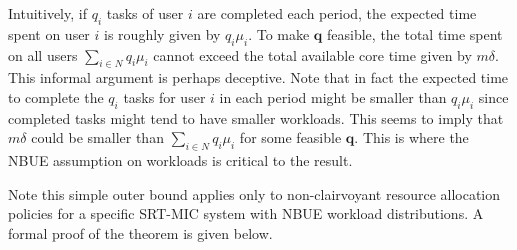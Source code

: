 \documentclass[prodmode,acmtompecs]{acmsmall}
\newcommand{\reqvec}{\mathbf{q}}
\newcommand{\reqscalar}{q}
\newcommand{\fullUserSet}{N}
\newcommand{\myComments}[1]{}
\newif\ifinfocom
\newif\iftompecs
\newcommand{\infocomStart}{\ifinfocom \myComments{Infocom: }}
\newcommand{\tompecsStart}{\iftompecs \myComments{TOMPECS version: }}
\newcommand{\commentEnd}{\myComments{End}}
\begin{document}
Intuitively, if $q_i$ tasks of user $i$ are completed each period, the expected time spent on user $i$ is roughly given by $q_i\mu_i$. To make $\reqvec$ feasible, the total time spent on all users $\sum\limits_{i\in \fullUserSet} q_i \mu_i$ cannot exceed the total available core time given by $m\delta$. 
This informal argument is perhaps deceptive. 
Note that in fact the expected time to complete the $q_i$ tasks for user $i$ in each period might be smaller than $q_i\mu_i$ since completed tasks might tend to have smaller workloads. This seems to imply that $m\delta$ could be smaller than $\sum\limits_{i\in \fullUserSet}\reqscalar_i \mu_i$ for some feasible $\reqvec$. This is where the NBUE assumption on workloads is critical to the result. 
\infocomStart
See Appendix \ref{appendix_pf_R_OB} for a detailed proof. 

This simple outer bound applies to any non-clairvoyant resource allocation policy in any specific SRT-MIC system with NBUE workload distributions. 
Note however the result does not necessarily hold for non-NBUE workloads. See the extended version of this paper \cite{EXT} for an illustrative example. 
\commentEnd\fi

\tompecsStart
Note this simple outer bound applies only to non-clairvoyant resource allocation policies for a specific SRT-MIC system with NBUE workload distributions. 
A formal proof of the theorem is given below. 
\end{document}
